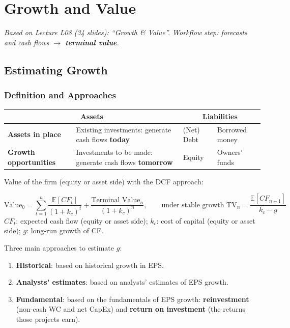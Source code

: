 \chapter{Growth and Value}\label{ch:growth}

\emph{Based on Lecture L08 (34 slides): ``Growth \& Value''. Workflow step: forecasts and cash flows $\to$ \textbf{terminal value}.}

\section{Estimating Growth}

\subsection{Definition and Approaches}

\begin{center}
\small
\begin{tabular}{@{}lp{5.2cm}|ll@{}}
\multicolumn{2}{c|}{\textbf{Assets}} & \multicolumn{2}{c}{\textbf{Liabilities}}\\
\midrule
\textbf{Assets in place} & Existing investments: generate cash flows \textbf{today} & (Net) Debt & Borrowed money\\
\textbf{Growth opportunities} & Investments to be made: generate cash flows \textbf{tomorrow} & Equity & Owners' funds\\
\end{tabular}
\end{center}
Value of the firm (equity or asset side) with the DCF approach:
\begin{keybox}
\[
\text{Value}_0=\sum_{t=1}^{n}\frac{\mathbb{E}[CF_t]}{(1+k_c)^t}+\frac{\text{Terminal Value}_n}{(1+k_c)^n},\qquad\text{under stable growth } \text{TV}_n=\frac{\mathbb{E}[CF_{n+1}]}{k_c-g}
\]
$CF_t$: expected cash flow (equity or asset side); $k_c$: cost of capital (equity or asset side); $g$: long-run growth of CF.
\end{keybox}
Three main approaches to estimate $g$:
\begin{enumerate}
  \item \textbf{Historical}: based on historical growth in EPS.
  \item \textbf{Analysts' estimates}: based on analysts' estimates of EPS growth.
  \item \textbf{Fundamental}: based on the fundamentals of EPS growth: \textbf{reinvestment} (non-cash WC and net CapEx) and \textbf{return on investment} (the returns those projects earn).
\end{enumerate}


